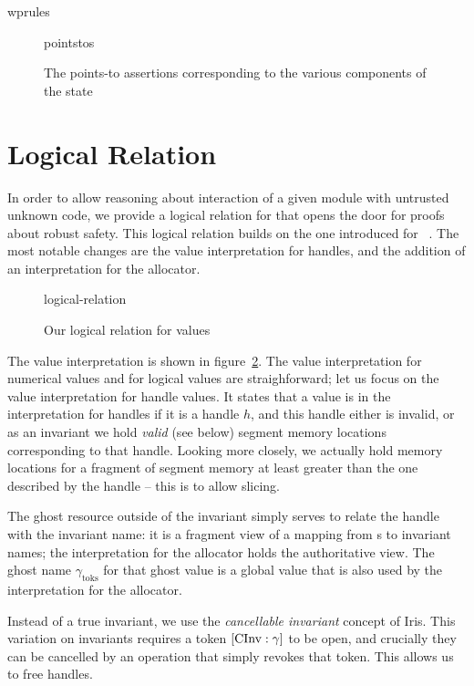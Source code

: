 \documentclass[acmsmall,screen]{acmart}\settopmatter{}
\begin{document}
{wprules}
\begin{figure}
{pointstos}
\caption{The points-to assertions corresponding to the various components of the state}
\label{fig:pointstos}
\end{figure}

\section{Logical Relation}

In order to allow reasoning about interaction of a given module with untrusted unknown code, we provide a logical relation for \irismswasm that opens the door for proofs about robust safety. This logical relation builds on the one introduced for \iriswasm~\cite{iriswasm}. The most notable changes are the value interpretation for handles, and the addition of an interpretation for the allocator.

\begin{figure}[t]
{logical-relation}
\label{app:fig:lrv}
\caption{Our logical relation for values}
\end{figure}

The value interpretation is shown in figure~\ref{app:fig:lrv}. The value interpretation for numerical values and for logical values are straighforward; let us focus on the value interpretation for handle values. It states that a value is in the interpretation for handles if it is a handle \( h \), and this handle either is invalid, or as an invariant we hold \emph{valid} (see below) segment memory locations corresponding to that handle. Looking more closely, we actually hold memory locations for a fragment of segment memory at least greater than the one described by the handle -- this is to allow slicing.

The ghost resource outside of the invariant simply serves to relate the handle \xxWid with the invariant name: it is a fragment view of a mapping from \xxWid{}s to invariant names; the interpretation for the allocator holds the authoritative view. The ghost name \( \gamma_{\mathrm{toks}} \) for that ghost value is a global value that is also used by the interpretation for the allocator.

Instead of a true invariant, we use the \emph{cancellable invariant} concept of Iris. This variation on invariants requires a token \( {[}\textrm{CInv}:\gamma{]} \) to be open, and crucially they can be cancelled by an operation that simply revokes that token. This allows us to free handles. 
\end{document}
